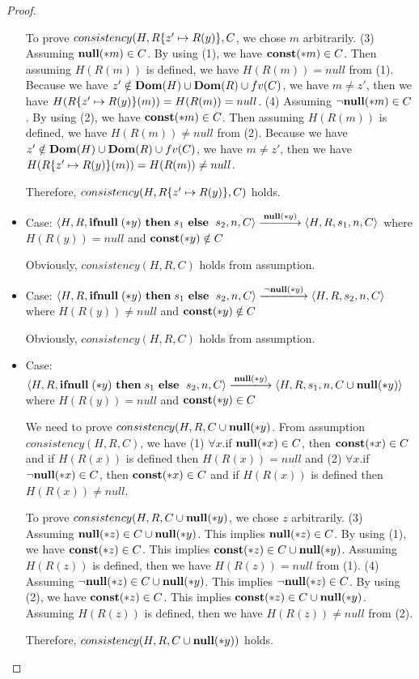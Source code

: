 \begin{proof}
\begin{itemize}
  To prove \(consistency(H, R\{z'\mapsto R(y)\}, C \), we chose
  \(m\) arbitrarily. (3) Assuming \(\mathbf{null}(*m) \in C\). By using (1),
  we have \(\mathbf{const}(*m) \in C\). Then assuming \(H(R(m))\) is defined,
  we have \(H(R(m)) = null\) from (1). Because we have \(z' \notin
  \mathbf{Dom}(H)\cup\mathbf{Dom}(R)\cup fv(C) \), we have \(m \ne z'\), then we have
  \( H(R\{z' \mapsto R(y)\}(m)) = H(R(m)) = null\). (4) Assuming
  \(\neg\mathbf{null}(*m) \in C\). By using (2), we have \(\mathbf{const}(*m) \in C\). Then
  assuming \(H(R(m))\) is defined, we have \(H(R(m)) \ne null\) from
  (2). Because we have \(z' \notin \mathbf{Dom}(H)\cup\mathbf{Dom}(R)\cup fv(C) \), we
  have \(m \ne z'\), then we have \( H(R\{z' \mapsto R(y)\}(m)) =
  H(R(m)) \ne null\).
  
  Therefore, \(consistency(H, R\{z' \mapsto R(y)\}, C)\) holds.

\item Case: \(\langle H, R, \IFNULL(*y) \ \THEN s_1\ \ELSE\ s_2, n, C
  \rangle \xlongrightarrow{\NULL(*y)} \langle H, R, s_1, n, C \rangle \)
  where \( H(R(y)) = null \) and \(\mathbf{const}(*y) \notin C\)

  Obviously, \(consistency(H, R, C) \) holds from assumption.

\item Case: \(\langle H, R, \IFNULL(*y) \ \THEN s_1\ \ELSE\ s_2, n, C
  \rangle \xlongrightarrow{\neg\NULL(*y)} \langle H, R, s_2, n, C \rangle \)
  where \( H(R(y)) \ne null \) and \(\mathbf{const}(*y) \notin C\)

 Obviously, \(consistency(H, R, C) \) holds from assumption.


\item Case: \(\langle H, R, \IFNULL(*y) \ \THEN s_1\ \ELSE\ s_2, n, C
  \rangle \xlongrightarrow{\NULL(*y)} \langle H, R, s_1, n, C \cup{\NULL(*y)}
  \rangle \) where \( H(R(y)) =  null \) and \(\mathbf{const}(*y) \in C\)
  
  We need to prove \(consistency(H, R, C\cup{\mathbf{null}(*y)} \). From
  assumption \(consistency(H, R, C)\), we have (1) \(\forall x\).if
  \({\bf null}(*x) \in C\), then \(\mathbf{const}(*x) \in C\) and if \(H(R(x))\) is
  defined then \(H(R(x)) = null\) and (2) \(\forall x\).if \(\neg{\bf null}(*x)
  \in C\), then \(\mathbf{const}(*x) \in C\) and if \(H(R(x))\) is defined
  then \(H(R(x)) \ne null\).

  To prove \(consistency(H, R, C\cup{\mathbf{null}(*y)} \), we chose \(z\)
  arbitrarily. (3) Assuming \(\mathbf{null}(*z) \in C\cup\mathbf{null}(*y)\). This
  implies \(\mathbf{null}(*z) \in C\). By using (1), we have \(\mathbf{const}(*z) \in
  C\). This implies \(\mathbf{const}(*z) \in C\cup\mathbf{null}(*y)\). Assuming
  \(H(R(z))\) is defined, then we have \(H(R(z)) = null\) from
  (1). (4) Assuming \(\neg\mathbf{null}(*z) \in C\cup\mathbf{null}(*y)\). This implies
  \(\neg\mathbf{null}(*z) \in C\). By using (2), we have \(\mathbf{const}(*z) \in C\). This
  implies \(\mathbf{const}(*z) \in C\cup\mathbf{null}(*y)\). Assuming \(H(R(z))\) is
  defined, then we have \(H(R(z)) \ne null\) from (2). 
                 
  Therefore, \(consistency(H, R, C\cup{\mathbf{null}(*y)})\) holds.

 \end{itemize}
\end{proof}


